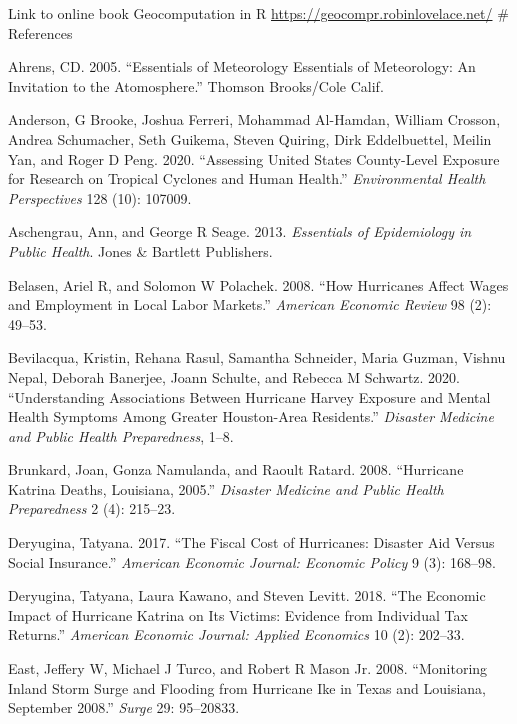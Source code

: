 \documentclass[
]{article}
\begin{document}
Link to online book Geocomputation in R
\url{https://geocompr.robinlovelace.net/} \# References

\hypertarget{refs}{}
\leavevmode\hypertarget{ref-ahrens2005essentials}{}%
Ahrens, CD. 2005. ``Essentials of Meteorology Essentials of Meteorology:
An Invitation to the Atomosphere.'' Thomson Brooks/Cole Calif.

\leavevmode\hypertarget{ref-anderson2020assessing}{}%
Anderson, G Brooke, Joshua Ferreri, Mohammad Al-Hamdan, William Crosson,
Andrea Schumacher, Seth Guikema, Steven Quiring, Dirk Eddelbuettel,
Meilin Yan, and Roger D Peng. 2020. ``Assessing United States
County-Level Exposure for Research on Tropical Cyclones and Human
Health.'' \emph{Environmental Health Perspectives} 128 (10): 107009.

\leavevmode\hypertarget{ref-aschengrau2013essentials}{}%
Aschengrau, Ann, and George R Seage. 2013. \emph{Essentials of
Epidemiology in Public Health}. Jones \& Bartlett Publishers.

\leavevmode\hypertarget{ref-belasen2008hurricanes}{}%
Belasen, Ariel R, and Solomon W Polachek. 2008. ``How Hurricanes Affect
Wages and Employment in Local Labor Markets.'' \emph{American Economic
Review} 98 (2): 49--53.

\leavevmode\hypertarget{ref-bevilacqua2020understanding}{}%
Bevilacqua, Kristin, Rehana Rasul, Samantha Schneider, Maria Guzman,
Vishnu Nepal, Deborah Banerjee, Joann Schulte, and Rebecca M Schwartz.
2020. ``Understanding Associations Between Hurricane Harvey Exposure and
Mental Health Symptoms Among Greater Houston-Area Residents.''
\emph{Disaster Medicine and Public Health Preparedness}, 1--8.

\leavevmode\hypertarget{ref-brunkard2008hurricane}{}%
Brunkard, Joan, Gonza Namulanda, and Raoult Ratard. 2008. ``Hurricane
Katrina Deaths, Louisiana, 2005.'' \emph{Disaster Medicine and Public
Health Preparedness} 2 (4): 215--23.

\leavevmode\hypertarget{ref-deryugina2017fiscal}{}%
Deryugina, Tatyana. 2017. ``The Fiscal Cost of Hurricanes: Disaster Aid
Versus Social Insurance.'' \emph{American Economic Journal: Economic
Policy} 9 (3): 168--98.

\leavevmode\hypertarget{ref-deryugina2018economic}{}%
Deryugina, Tatyana, Laura Kawano, and Steven Levitt. 2018. ``The
Economic Impact of Hurricane Katrina on Its Victims: Evidence from
Individual Tax Returns.'' \emph{American Economic Journal: Applied
Economics} 10 (2): 202--33.

\leavevmode\hypertarget{ref-east2008monitoring}{}%
East, Jeffery W, Michael J Turco, and Robert R Mason Jr. 2008.
``Monitoring Inland Storm Surge and Flooding from Hurricane Ike in Texas
and Louisiana, September 2008.'' \emph{Surge} 29: 95--20833.
\end{document}
